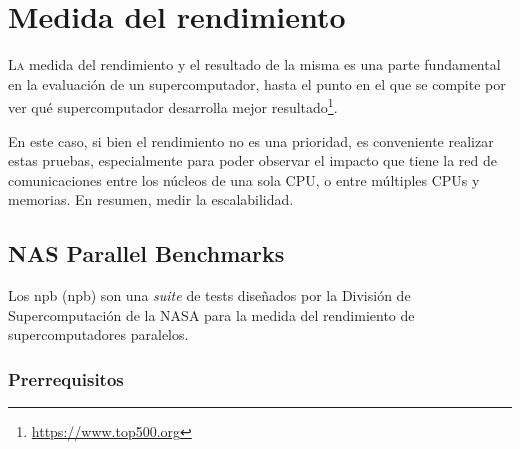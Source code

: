 \chapter{Medida del rendimiento}
\label{chap:medida_rendimiento}

\lettrine{L}{a} medida del rendimiento y el resultado de la misma es una parte fundamental en la evaluación de un supercomputador, hasta el punto en el que se compite por ver qué supercomputador desarrolla mejor resultado\footnote{\url{https://www.top500.org}}.

En este caso, si bien el rendimiento no es una prioridad, es conveniente realizar estas pruebas, especialmente para poder observar el impacto que tiene la red de comunicaciones entre los núcleos de una sola CPU, o entre múltiples CPUs y memorias. En resumen, medir la escalabilidad.

\section{NAS Parallel Benchmarks}
Los \acrlong{npb} (\acrshort{npb}) son una \textit{suite} de tests diseñados por la División de Supercomputación de la NASA para la medida del rendimiento de supercomputadores paralelos.

\subsection{Prerrequisitos}

